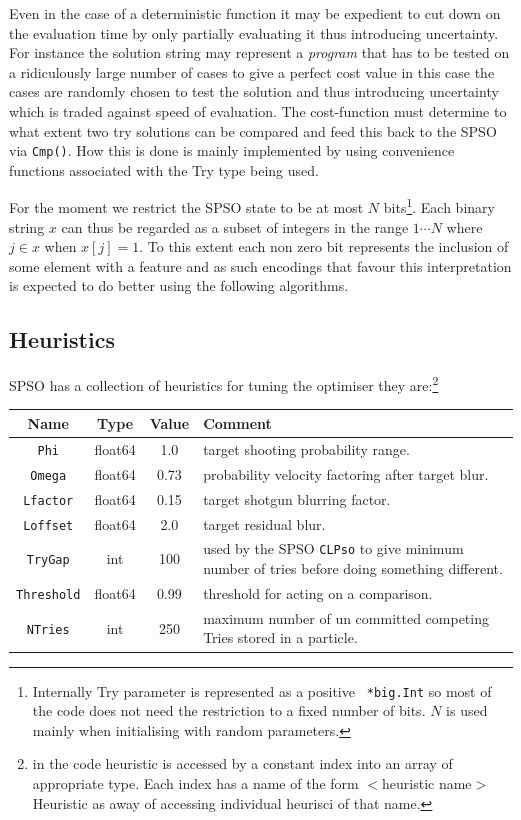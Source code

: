 \documentclass[a4paper,oneside,english]{book}
\numberwithin{equation}{section}
\numberwithin{figure}{section}
\begin{document}
Even in the case of a deterministic  function it may be expedient to cut down on the evaluation time by only partially evaluating it thus introducing uncertainty. For instance the solution string may represent a \emph{program} that has to be tested on a ridiculously large number of cases to give a perfect cost value in this case the cases are randomly chosen to test the solution and thus introducing uncertainty which is traded against speed of evaluation. The cost-function must determine to what extent two try solutions can be compared and feed this back to the SPSO via \texttt{Cmp()}. How this is done is mainly implemented by using convenience functions associated with the Try type being used.  

For the moment we restrict the SPSO state to be at most $N$ bits\footnote{Internally Try parameter is represented as a positive \texttt{ *big.Int} so most of the code does not need the restriction to a fixed number of bits. $N$ is used mainly when initialising with random parameters. }. Each binary string $x$ can thus be regarded as a subset of integers in the range $1 \cdots N$  where $j \in x$ when $x[j] = 1$. To this extent each non zero bit represents the inclusion of some element with a feature and as such encodings that favour this interpretation is expected to do better using the following algorithms. 

\subsection{Heuristics}

SPSO has a collection of heuristics for tuning the optimiser they are:\footnote{in the code  heuristic is accessed by a constant index into an array of appropriate type. Each index has a name of the form $<$heuristic name$>$Heuristic as away of accessing individual heurisci of that name.  } 

\begin{tabular}{|c|c|c|p{6cm}|}\hline	
	Name& Type &Value& Comment\\
	\hline \hline 
	\texttt{Phi}&float64&1.0& target shooting probability range. \\
	\texttt{Omega}& float64&0.73&probability velocity factoring after target blur.\\
   \texttt{Lfactor}& float64&0.15&target shotgun blurring factor. \\
	\texttt{Loffset}& float64&2.0& target residual blur.\\
	\texttt{TryGap}& int&100&used by the SPSO \texttt{CLPso} to give minimum 
	number of tries before doing something different.\\
	\texttt{Threshold}& float64&0.99& threshold for acting on a comparison.\\
	\texttt{NTries}& int&250&maximum number of un committed competing Tries  stored in a particle.\\
	\hline
\end{tabular}
\end{document}
